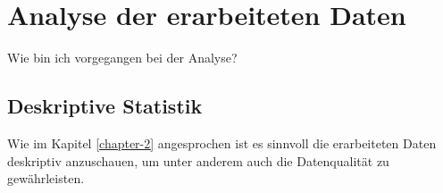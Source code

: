 \chapter{Analyse der erarbeiteten Daten}

Wie bin ich vorgegangen bei der Analyse?

\section{Deskriptive Statistik}
Wie im Kapitel \ref{chapter-2} angesprochen ist es sinnvoll die erarbeiteten Daten deskriptiv anzuschauen, 
um unter anderem auch die Datenqualität zu gewährleisten. 

\subsection{}
